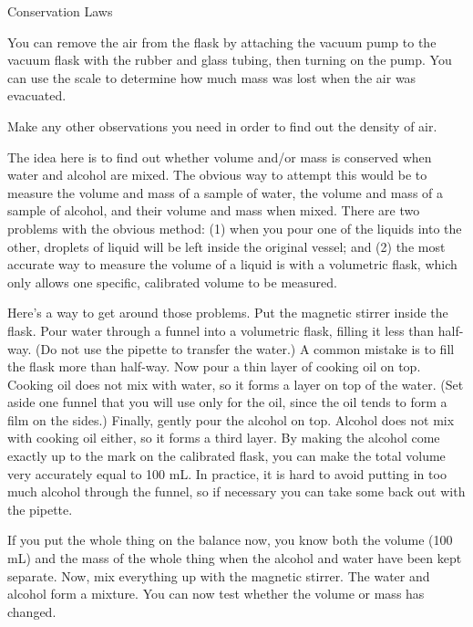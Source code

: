 \begin{lab}{Conservation Laws}
\labobservations


You can remove the air from the flask by attaching the
vacuum pump to the vacuum flask with the rubber and glass
tubing, then turning on the pump.  You can use the scale to
determine how much mass was lost when the air was evacuated.

Make any other observations you need in order to find out
the density of air.


The idea here is to find out whether volume and/or mass is
conserved when water and alcohol are mixed.  The obvious way
to attempt this would be to measure the volume and mass of a
sample of water, the volume and mass of a sample of alcohol,
and their volume and mass when mixed.  There are two
problems with the obvious method: (1) when you pour one of
the liquids into the other, droplets of liquid will be left
inside the original vessel; and (2) the most accurate way to
measure the volume of a liquid is with a volumetric flask,
which only allows one specific, calibrated volume to be measured.


Here's a way to get around those problems.  Put the magnetic
stirrer inside the flask.  Pour water through a funnel into
a volumetric flask, filling it less than half-way.  (Do not
use the pipette to transfer the water.)  A common mistake is
to fill the flask more than half-way.  Now pour a thin layer
of cooking oil on top.  Cooking oil does not mix with water,
so it forms a layer on top of the water.  (Set aside one
funnel that you will use only for the oil, since the oil
tends to form a film on the sides.)  Finally, gently pour
the alcohol on top.  Alcohol does not mix with cooking oil
either, so it forms a third layer.  By making the alcohol
come exactly up to the mark on the calibrated flask, you can
make the total volume very accurately equal to 100 mL.  In
practice, it is hard to avoid putting in too much alcohol
through the funnel, so if necessary you can take some back
out with the pipette.

If you put the whole thing on the balance now, you know both
the volume (100 mL) and the mass of the whole thing when the
alcohol and water have been kept separate.  Now, mix
everything up with the magnetic stirrer.  The water and
alcohol form a mixture.  You can now test whether the volume
or mass has changed.


\end{lab}
